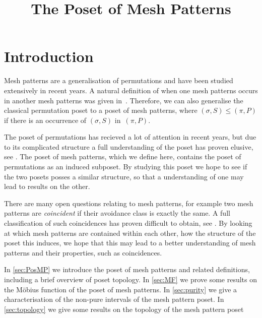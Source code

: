 \documentclass[11pt,a4paper,oneside]{article}
\title{The Poset of Mesh Patterns}
\begin{document}
	\maketitle


\section{Introduction}
Mesh patterns are a generalisation of permutations and have been studied extensively in recent years.
A natural definition of when one mesh patterns occurs in another mesh patterns was given in~\cite{TU17}.
Therefore, we can also generalise the classical permutation poset to a poset of mesh patterns, where 
$(\sigma,S)\le(\pi,P)$ if there is an occurrence of $(\sigma,S)$ in~$(\pi,P)$.

The poset of permutations has recieved a lot of attention in recent years, but due to its
complicated structure a full understanding of the poset has proven elusive,
see \cite{Smith14,Smith15}. The poset of mesh patterns, which we define
here, contains the poset of permutations as an induced subposet. By studying this poset we 
hope to see if the two posets posses a similar structure, so that a understanding of one 
may lead to results on the other.

There are many open questions relating to mesh patterns, for example two mesh patterns
are \emph{coincident} if their avoidance class is exactly the same. A full classification
of such coincidences has proven difficult to obtain, see \cite{}. By looking at which
mesh patterns are contained within each other, how the structure of the poset this induces,
we hope that this may lead to a better understanding of mesh patterns and their properties,
such as coincidences.

In \cref{sec:PosMP} we introduce the poset of mesh patterns and related definitions,
including a brief overview of poset topology. In \cref{sec:MF} we prove some results
on the M\"obius function of the poset of mesh patterns. In \cref{sec:purity} we give
a characterisation of the non-pure intervals of the mesh pattern poset.
In \cref{sec:topology} we give some results on the topology of the mesh pattern poset
\end{document}
